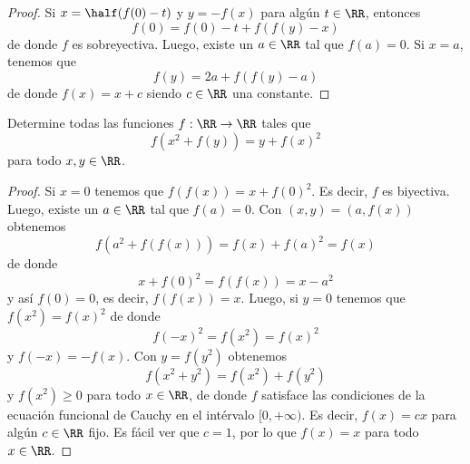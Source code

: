 \begin{proof}
	Si $x=\half(f(0)-t)$ y $y=-f(x)$ para algún $t\in\RR$, entonces
	\[f(0)=f(0)-t+f(f(y)-x)\]
	de donde $f$ es sobreyectiva. Luego, existe un $a\in\RR$ tal que $f(a)=0$. Si $x=a$, tenemos que
	\[f(y)=2a+f(f(y)-a)\]
	de donde $f(x)=x+c$ siendo $c\in\RR$ una constante.
\end{proof}

\begin{probEG}
	Determine todas las funciones $f:\RR\to\RR$ tales que
	\[f(x^2+f(y))=y+f(x)^2\]
	para todo $x,y\in\RR$.
\end{probEG}

\begin{proof}
	Si $x=0$ tenemos que $f(f(x))=x+f(0)^2$. Es decir, $f$ es biyectiva. Luego, existe un $a\in\RR$ tal que $f(a)=0$. Con $(x,y)=(a,f(x))$ obtenemos
	\[f(a^2+f(f(x)))=f(x)+f(a)^2=f(x)\]
	de donde
	\[x+f(0)^2=f(f(x))=x-a^2\]
	y así $f(0)=0$, es decir, $f(f(x))=x$. Luego, si $y=0$ tenemos que $f(x^2)=f(x)^2$ de donde
	\[f(-x)^2=f(x^2)=f(x)^2\]
	y $f(-x)=-f(x)$. Con $y=f(y^2)$ obtenemos
	\[f(x^2+y^2)=f(x^2)+f(y^2)\]
	y $f(x^2)\ge 0$ para todo $x\in\RR$, de donde $f$ satisface las condiciones de la ecuación funcional de Cauchy en el intérvalo $[0,+\infty)$. Es decir, $f(x)=cx$ para algún $c\in\RR$ fijo. Es fácil ver que $c=1$, por lo que $f(x)=x$ para todo $x\in\RR$.
\end{proof}
